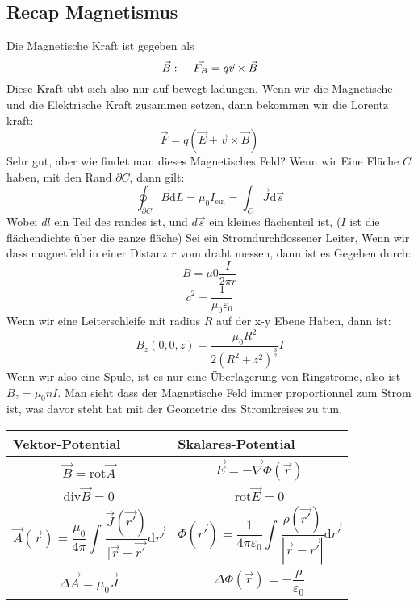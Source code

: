 \documentclass{article}
\newcommand{\mspc}{\hspace{0.4cm}}
\begin{document}
\subsection*{Recap Magnetismus}
Die Magnetische Kraft ist gegeben als \[\vec{B}:\mspc \vec{F_B}=q \vec{v}\times \vec{B}\]
Diese Kraft übt sich also nur auf bewegt ladungen. Wenn wir die Magnetische und die Elektrische Kraft zusammen setzen, dann bekommen wir die Lorentz kraft:
\[\vec{F}=q\left(\vec{E}+\vec{v}\times \vec{B}\right)\]
Sehr gut, aber wie findet man dieses Magnetisches Feld? Wenn wir Eine Fläche $C$ haben, mit den Rand $\partial C$, dann gilt:
\[\oint^{}_{\partial C}\vec{B}\text{d}L=\mu_0 I_\text{ein}=\int^{}_{C}\vec{J}\text{d}\vec{s}\]
Wobei $dl$ ein Teil des randes ist, und $d \vec{s}$ ein kleines flächenteil ist, ($I$ ist die flächendichte über die ganze fläche)
\newline
Sei ein Stromdurchflossener Leiter, Wenn wir dass magnetfeld in einer Distanz $r$ vom draht messen, dann ist es Gegeben durch:
\[B=\mu0 \frac{I }{2\pi r}\]
\[c^2=\frac{1}{\mu_0 \varepsilon_0}\]
Wenn wir eine Leiterschleife mit radius $R$ auf der x-y Ebene Haben, dann ist:
\[B_z(0,0,z)=\frac{\mu_0 R^2}{2(R^2+z^2)^{\frac{3}{2}}}I \]
Wenn wir also eine Spule, ist es nur eine Überlagerung von Ringströme, also ist $B_z=\mu_0 n I $. 
\newline Man sieht dass der Magnetische Feld immer proportionnel zum Strom ist, was davor steht hat mit der Geometrie des Stromkreises zu tun.
\begin{center}
\begin{tabular}{|p{4cm}|p{4cm}|}
  \hline
  \textbf{Vektor-Potential}&\textbf{Skalares-Potential}\\\hline
  \[\vec{B}=\text{rot}\vec{A}\]&\[\vec{E}=-\vec{\nabla}\Phi(\vec{r})\]\\\hline
  \[\text{div}\vec{B }=0\]&\[\text{rot}\vec{E}=0\]\\\hline
  \[\vec{A}(\vec{r})=\frac{\mu_0}{4\pi}\int^{}_{}\frac{\vec{J}(\vec{r'})}{|\vec{r}-\vec{r'}}\text{d}\vec{r'}\]&\[\Phi(\vec{r'})=\frac{1}{4\pi \varepsilon_0}\int^{}_{}\frac{\rho(\vec{r'})}{|\vec{r}-\vec{r'}|}\text{d}\vec{r'}\]\\\hline
  \[\Delta \vec{A}=\mu_0 \vec{J}\]&\[\Delta \Phi(\vec{r})=-\frac{\rho}{\varepsilon_0}\]\\\hline
\end{tabular}
\end{center}
\end{document}
